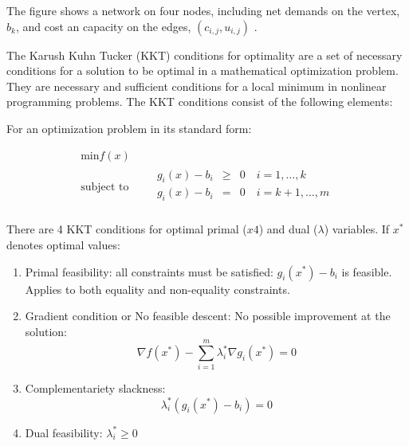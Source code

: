 \Exercise The figure shows a network on four nodes, including net demands on the vertex, $b_k$, and cost an capacity on the edges, $(c_{i,j},u_{i,j})$ . 



\Answer 


The Karush Kuhn Tucker (KKT) conditions  for optimality are a set of necessary conditions for a solution to be optimal in a mathematical optimization problem. They are necessary and sufficient conditions for a local minimum in nonlinear programming problems. The KKT conditions consist of the following elements:

For an optimization problem in its standard form:

\begin{equation*}
  \begin{aligned}
    \text{min} f(x) \\
    \text{subject to }\quad &
    \begin{array}{rcl}
      g_i(x)-b_i  & \geq & 0 \quad i=1,\ldots,k \\
      g_i(x)-b_i  & = & 0 \quad i=k+1,\ldots,m \\
    \end{array}
  \end{aligned}
\end{equation*}

There are 4 KKT conditions for optimal primal ($x4$) and dual ($\lambda$) variables. If $x^*$ denotes optimal values:
\begin{enumerate}
  \item Primal feasibility: all constraints must be satisfied: $g_i(x^*)-b_i$ is feasible. Applies to both equality and non-equality constraints.
  \item Gradient condition or No feasible descent: No possible improvement at the solution: 
  \[ \nabla f(x^*)-\sum_{i=1}^m \lambda_i^* \nabla g_i (x^*)=0\]
  \item Complementariety slackness: 
  \[\lambda_i^* (g_i(x^*)-b_i)=0\]
  \item Dual feasibility: $\lambda_i^*\geq 0$
\end{enumerate}

